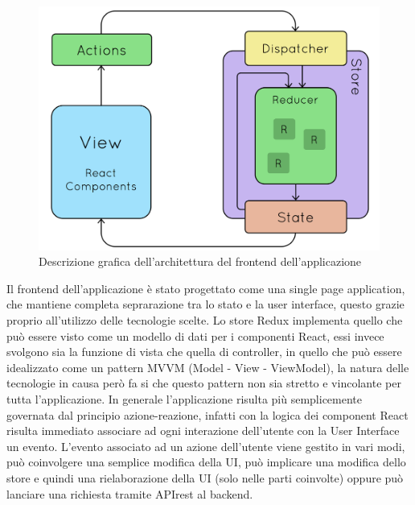 \begin{figure}[H]
  \centering
  \includegraphics[width=\textwidth]{immagini/architettura-frontend.png}
  \caption{Descrizione grafica dell'architettura del frontend dell'applicazione}
\end{figure}

Il frontend dell'applicazione è stato progettato come una single page application, che mantiene completa seprarazione tra lo stato e la user interface, questo grazie proprio
all'utilizzo delle tecnologie scelte. Lo store Redux implementa quello che può essere visto come un modello di dati per i componenti React, essi invece svolgono sia la funzione
di vista che quella di controller, in quello che può essere idealizzato come un pattern MVVM (Model - View - ViewModel), la natura delle tecnologie in causa però fa si che questo
pattern non sia stretto e vincolante per tutta l'applicazione. In generale l'applicazione risulta più semplicemente governata dal principio azione-reazione, infatti con la logica dei
component React risulta immediato associare ad ogni interazione dell'utente con la User Interface un evento. L'evento associato ad un azione dell'utente viene gestito in vari modi,
può coinvolgere una semplice modifica della UI, può implicare una modifica dello store e quindi una rielaborazione della UI (solo nelle parti coinvolte) oppure può lanciare una
richiesta tramite APIrest al backend.

